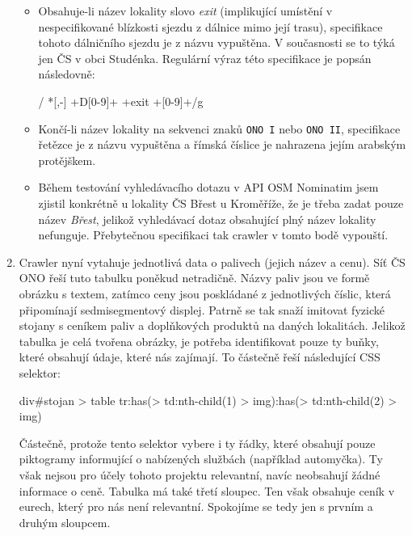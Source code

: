 \begin{enumerate}
        \begin{itemize}
            \item Obsahuje-li název lokality slovo \emph{exit}
                (implikující umístění v nespecifikované blízkosti sjezdu
                z dálnice mimo její trasu), specifikace tohoto dálničního
                sjezdu je z názvu vypuštěna. V současnosti se to týká jen ČS
                v obci Studénka. Regulární výraz této specifikace je popsán
                následovně:
                
                \begin{tt}
                    \centering
                    / *[,-] +D[0-9]+ +exit +[0-9]+/g
                \end{tt}
            \item Končí-li název lokality na sekvenci znaků \texttt{ONO I}
                nebo \texttt{ONO II}, specifikace řetězce je z názvu
                vypuštěna a římská číslice je nahrazena jejím arabským
                protějškem.
            \item Během testování vyhledávacího dotazu v API OSM Nominatim
                jsem zjistil konkrétně u lokality ČS Břest u Kroměříže,
                že je třeba zadat pouze název \emph{Břest}, jelikož
                vyhledávací dotaz obsahující plný název lokality nefunguje.
                Přebytečnou specifikaci tak crawler v tomto bodě vypouští.
        \end{itemize}
    \item Crawler nyní vytahuje jednotlivá data o palivech (jejich název
        a cenu). Síť ČS ONO řeší tuto tabulku poněkud netradičně. Názvy
        paliv jsou ve formě obrázku s textem, zatímco ceny jsou poskládané
        z jednotlivých číslic, která připomínají sedmisegmentový displej.
        Patrně se tak snaží imitovat fyzické stojany s ceníkem paliv
        a doplňkových produktů na daných lokalitách. Jelikož tabulka je celá
        tvořena obrázky, je potřeba identifikovat pouze ty buňky, které
        obsahují údaje, které nás zajímají. To částečně řeší následující
        CSS selektor:

        \begin{tt}
            \centering
            div\#stojan > table tr:has(> td:nth-child(1) > img):has(> td:nth-child(2) > img)
        \end{tt}

        Částečně, protože tento selektor vybere i ty řádky, které obsahují
        pouze piktogramy informující o nabízených službách (například
        automyčka). Ty však nejsou pro účely tohoto projektu relevantní,
        navíc neobsahují žádné informace o ceně. Tabulka má také třetí
        sloupec. Ten však obsahuje ceník v eurech, který pro nás není
        relevantní. Spokojíme se tedy jen s prvním a druhým sloupcem.


\end{enumerate}

